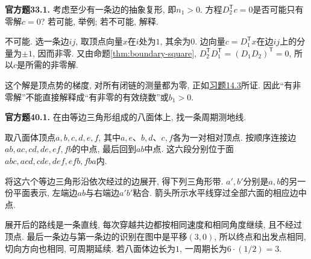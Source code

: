\begin{exercise}\label{cq:33.1}
\textbf{官方题33.1.} 考虑至少有一条边的抽象复形, 即$n_1>0$. 方程$D_2^{\mathsf T}c=0$是否可能只有零解$c=0$? 若可能, 举例; 若不可能, 解释.
\end{exercise}
\begin{solution}
不可能. 选一条边$ij$, 取顶点向量$x$在$i$处为$1$, 其余为$0$. 边向量$c=D_1^{\mathsf T}x$在边$ij$上的分量为$\pm1$, 因而非零. 又由命题\ref{thm:boundary-square}, $D_2^{\mathsf T}D_1^{\mathsf T}=(D_1D_2)^{\mathsf T}=0$, 所以$c$是所需的非零解.

这个解是顶点势的梯度, 对所有闭链的测量都为零, 正如\hyperlink{exercise.14.3}{习题14.3}所证. 因此“有非零解”不能直接解释成“有非零的有效绕数”或$b_1>0$.
\end{solution}

\begin{exercise}\label{cq:40.1}
\textbf{官方题40.1.} 在由等边三角形组成的八面体上, 找一条周期测地线.
\end{exercise}
\begin{solution}
取八面体顶点$a,b,c,d,e,f$, 其中$a,e$、$b,d$、$c,f$各为一对相对顶点. 按顺序连接边$ab,ac,cd,de,ef,fb$的中点, 最后回到$ab$中点. 这六段分别位于面$abc,acd,cde,def,efb,fba$内.

将这六个等边三角形沿依次经过的边展开, 得下列三角形带. $a',b'$分别是$a,b$的另一份平面表示, 左端边$ab$与右端边$a'b'$粘合. 箭头所示水平线穿过全部六面的相应边中点.
\begin{center}
\end{center}
展开后的路线是一条直线, 每次穿越共边都按相同速度和相同角度继续, 且不经过顶点. 最后一条边与第一条边的识别在图中是平移$(3,0)$, 所以终点和出发点相同, 切向方向也相同, 可周期延续. 若八面体边长为$1$, 一周期长为$6\cdot(1/2)=3$.
\end{solution}

